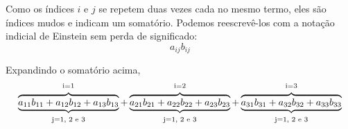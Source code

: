     Como os índices $i$ e $j$ se repetem duas vezes cada no mesmo termo, eles são índices mudos e indicam um somatório. Podemos reescrevê-los com a notação indicial de Einstein sem perda de significado:
    \[a_{ij}b_{ij}\]
    
    Expandindo o somatório acima,
    \[
        \displaystyle\overbrace{\displaystyle\underbrace{a_{11}b_{11}+a_{12}b_{12}+a_{13}b_{13}}_{\ShiftDown{0.5ex}{j=1\text{, }2\text{ e }3}}}^{\ShiftUp{0.5ex}{i=1}}+
        \displaystyle\overbrace{\displaystyle\underbrace{a_{21}b_{21}+a_{22}b_{22}+a_{23}b_{23}}_{\ShiftDown{0.5ex}{j=1\text{, }2\text{ e }3}}}^{\ShiftUp{0.5ex}{i=2}}+
        \displaystyle\overbrace{\displaystyle\underbrace{a_{31}b_{31}+a_{32}b_{32}+a_{33}b_{33}}_{\ShiftDown{0.5ex}{j=1\text{, }2\text{ e }3}}}^{\ShiftUp{0.5ex}{i=3}}
    \]